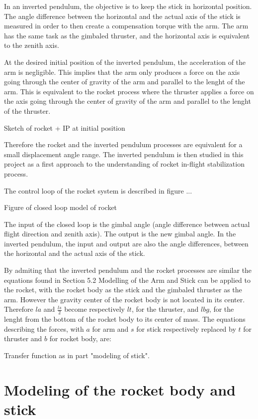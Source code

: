 In an inverted pendulum, the objective is to keep the stick in horizontal position. The angle difference between the horizontal and the actual axis of the stick is measured in order to then create a compensation torque with the arm. The arm has the same task as the gimbaled thruster, and the horizontal axis is equivalent to the zenith axis.

At the desired initial position of the inverted pendulum, the acceleration of the arm is negligible. This implies that the arm only produces a force on the axis going through the center of gravity of the arm and parallel to the lenght of the arm. This is equivalent to the rocket process where the thruster applies a force on the axis going through the center of gravity of the arm and parallel to the lenght of the thruster. 

 Sketch of rocket + IP at initial position

Therefore the rocket and the inverted pendulum processes are equivalent for a small displacement angle range. The inverted pendulum is then studied in this project as a first approach to the understanding of rocket in-flight stabilization process.

The control loop of the rocket system is described in figure ...

Figure of closed loop model of rocket

The input of the closed loop is the gimbal angle (angle difference between actual flight direction and zenith axis). The output is the new gimbal angle. In the inverted pendulum, the input and output are also the angle differences, between the horizontal and the actual axis of the stick. 

By admiting that the inverted pendulum and the rocket processes are similar the equations found in Section 5.2 Modelling of the Arm and Stick can be applied to the rocket, with the rocket body as the stick and the gimbaled thruster as the arm. However the gravity center of the rocket body is not located in its center. Therefore $la$ and $\frac{ls}{2}$ become respectively $lt$, for the thruster, and $lbg$, for the lenght from the bottom of the rocket body to its center of mass. The equations describing the forces, with $a$ for arm and $s$ for stick respectively replaced by $t$ for thruster and $b$ for rocket body, are:

Transfer function as in part "modeling of stick".

	\section{Modeling of the rocket body and stick}
	
